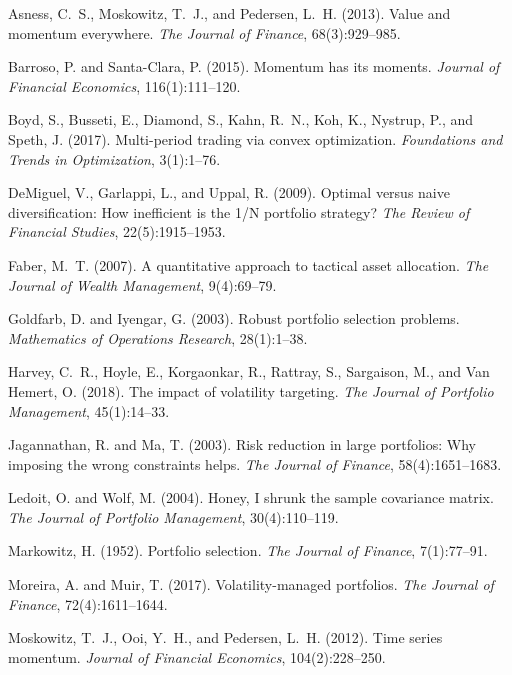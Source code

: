 \documentclass[11pt]{article}
\begin{document}
\begin{thebibliography}{}

Asness, C.~S., Moskowitz, T.~J., and Pedersen, L.~H. (2013).
\newblock Value and momentum everywhere.
\newblock \emph{The Journal of Finance}, 68(3):929--985.

Barroso, P. and Santa-Clara, P. (2015).
\newblock Momentum has its moments.
\newblock \emph{Journal of Financial Economics}, 116(1):111--120.

Boyd, S., Busseti, E., Diamond, S., Kahn, R.~N., Koh, K., Nystrup, P., and Speth, J. (2017).
\newblock Multi-period trading via convex optimization.
\newblock \emph{Foundations and Trends in Optimization}, 3(1):1--76.

DeMiguel, V., Garlappi, L., and Uppal, R. (2009).
\newblock Optimal versus naive diversification: How inefficient is the 1/N portfolio strategy?
\newblock \emph{The Review of Financial Studies}, 22(5):1915--1953.

Faber, M.~T. (2007).
\newblock A quantitative approach to tactical asset allocation.
\newblock \emph{The Journal of Wealth Management}, 9(4):69--79.

Goldfarb, D. and Iyengar, G. (2003).
\newblock Robust portfolio selection problems.
\newblock \emph{Mathematics of Operations Research}, 28(1):1--38.

Harvey, C.~R., Hoyle, E., Korgaonkar, R., Rattray, S., Sargaison, M., and Van Hemert, O. (2018).
\newblock The impact of volatility targeting.
\newblock \emph{The Journal of Portfolio Management}, 45(1):14--33.

Jagannathan, R. and Ma, T. (2003).
\newblock Risk reduction in large portfolios: Why imposing the wrong constraints helps.
\newblock \emph{The Journal of Finance}, 58(4):1651--1683.

Ledoit, O. and Wolf, M. (2004).
\newblock Honey, I shrunk the sample covariance matrix.
\newblock \emph{The Journal of Portfolio Management}, 30(4):110--119.

Markowitz, H. (1952).
\newblock Portfolio selection.
\newblock \emph{The Journal of Finance}, 7(1):77--91.

Moreira, A. and Muir, T. (2017).
\newblock Volatility-managed portfolios.
\newblock \emph{The Journal of Finance}, 72(4):1611--1644.

Moskowitz, T.~J., Ooi, Y.~H., and Pedersen, L.~H. (2012).
\newblock Time series momentum.
\newblock \emph{Journal of Financial Economics}, 104(2):228--250.

\end{thebibliography}
\end{document}
